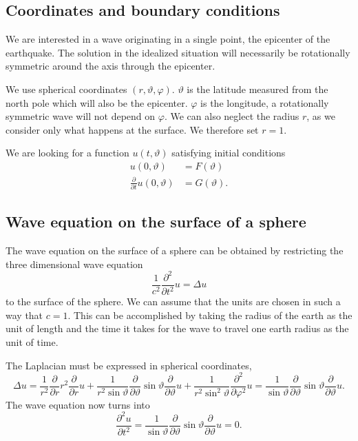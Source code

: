 \subsection{Coordinates and boundary conditions}
We are interested in a wave originating in a single point, the
epicenter of the earthquake.
The solution in the idealized situation will necessarily be rotationally
symmetric around the axis through the epicenter.

We use spherical coordinates $(r,\vartheta,\varphi)$.
$\vartheta$ is the latitude measured from the north pole which will
also be the epicenter.
$\varphi$ is the longitude, a rotationally symmetric wave will not
depend on $\varphi$.
We can also neglect the radius $r$, as we consider only what happens at the
surface.
We therefore set $r=1$.

We are looking for a function
$u(t,\vartheta)$ satisfying initial conditions
\begin{align*}
u(0,\vartheta)&=F(\vartheta)\\
\frac{\partial}{\partial t}u(0,\vartheta)&=G(\vartheta).
\end{align*}

\subsection{Wave equation on the surface of a sphere}
The wave equation on the surface of a sphere can be obtained
by restricting the three dimensional wave equation
\[
\frac1{c^2} \frac{\partial^2}{\partial t^2}u =\Delta u
\]
to the surface of the sphere.
We can assume that the units are chosen in such a way that 
$c=1$.
This can be accomplished by taking the radius of the earth as the
unit of length and the time it takes for the wave to travel one
earth radius as the unit of time.

The Laplacian must be expressed in spherical coordinates,
\[
\Delta u
=
\frac1{r^2} \frac{\partial}{\partial r}r^2\frac{\partial}{\partial r}u
+
\frac1{r^2\sin\vartheta}
\frac{\partial}{\partial\vartheta}
\sin\vartheta
\frac{\partial}{\partial\vartheta}
u
+
\frac1{r^2\sin^2\vartheta}\frac{\partial^2}{\partial\varphi^2}u
=
\frac1{\sin\vartheta}
\frac{\partial}{\partial\vartheta}
\sin\vartheta
\frac{\partial}{\partial\vartheta}
u.
\]
The wave equation now turns into
\begin{equation}
\frac{\partial^2u}{\partial t^2}=
\frac1{\sin\vartheta}
\frac{\partial}{\partial\vartheta}
\sin\vartheta
\frac{\partial}{\partial\vartheta}
u=0.
\label{tsunami-gleichung}
\end{equation}

